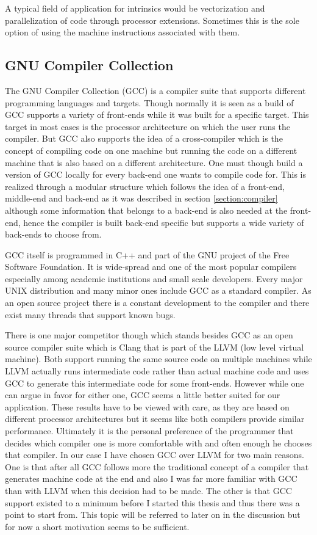 A typical field of application for intrinsics would be vectorization and parallelization of code through processor extensions.
Sometimes this is the sole option of using the machine instructions associated with them.

\subsection{GNU Compiler Collection}
The GNU Compiler Collection (GCC) is a compiler suite that supports different programming languages and targets.
Though normally it is seen as a build of GCC supports a variety of front-ends while it was built for a specific target.
This target in most cases is the processor architecture on which the user runs the compiler.
But GCC also supports the idea of a cross-compiler which is the concept of compiling code on one machine but running the code on a different machine that is also based on a different architecture.
One must though build a version of GCC locally for every back-end one wants to compile code for.
This is realized through a modular structure which follows the idea of a front-end, middle-end and back-end as it was described in section \ref{section:compiler} although some information that belongs to a back-end is also needed at the front-end, hence the compiler is built back-end specific but supports a wide variety of back-ends to choose from.

GCC itself is programmed in C++ and part of the GNU project of the Free Software Foundation.
It is wide-spread and one of the most popular compilers especially among academic institutions and small scale developers.
Every major UNIX distribution and many minor ones include GCC as a standard compiler.\cite{definitveGCCGuide:introduction}
As an open source project there is a constant development to the compiler and there exist many threads that support known bugs.

There is one major competitor though which stands besides GCC as an open source compiler suite which is Clang that is part of the LLVM (low level virtual machine).
Both support running the same source code on multiple machines while LLVM actually runs intermediate code rather than actual machine code and uses GCC to generate this intermediate code for some front-ends.
However while one can argue in favor for either one, GCC seems a little better suited for our application. 
These results have to be viewed with care, as they are based on different processor architectures but it seems like both compilers provide similar performance.
Ultimately it is the personal preference of the programmer that decides which compiler one is more comfortable with and often enough he chooses that compiler.
In our case I have chosen GCC over LLVM for two main reasons.
One is that after all GCC follows more the traditional concept of a compiler that generates machine code at the end and also I was far more familiar with GCC than with LLVM when this decision had to be made.
The other is that GCC support existed to a minimum before I started this thesis and thus there was a point to start from.
This topic will be referred to later on in the discussion but for now a short motivation seems to be sufficient.


